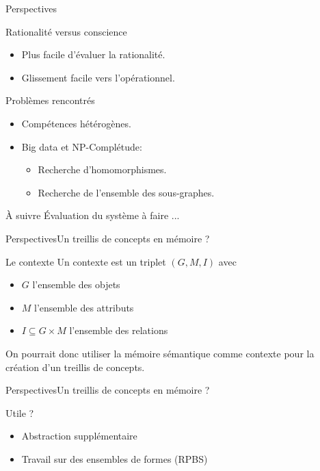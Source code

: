 \begin{frame}{Perspectives}

\begin{block}{Rationalité versus conscience}
\begin{itemize}
\item Plus facile d'évaluer la rationalité.
\item Glissement facile vers l'opérationnel.
\end{itemize}
\end{block}

\pause

\begin{block}{Problèmes rencontrés}
\begin{itemize}
\item Compétences hétérogènes.
\item Big data et NP-Complétude:
\begin{itemize}
\item Recherche d'homomorphismes.
\item Recherche de l'ensemble des sous-graphes.
\end{itemize}
\end{itemize}
\end{block}

\pause

\begin{block}{À suivre}
Évaluation du système à faire ...
\end{block}

\end{frame}

\begin{frame}{Perspectives}{Un treillis de concepts en mémoire ?}
\begin{block}{Le contexte}
Un contexte est un triplet $(G,M,I)$ avec
\begin{itemize}
\item $G$ l'ensemble des objets
\item $M$ l'ensemble des attributs
\item $I \subseteq G \times M$ l'ensemble des relations
\end{itemize}
On pourrait donc utiliser la mémoire sémantique comme contexte pour la création d'un treillis de concepts.
\end{block}
\end{frame}

\begin{frame}{Perspectives}{Un treillis de concepts en mémoire ?}
\begin{block}{Utile ?}
\begin{itemize}
\item Abstraction supplémentaire
\item Travail sur des ensembles de formes (RPBS)
\end{itemize}
\end{block}
\end{frame}

